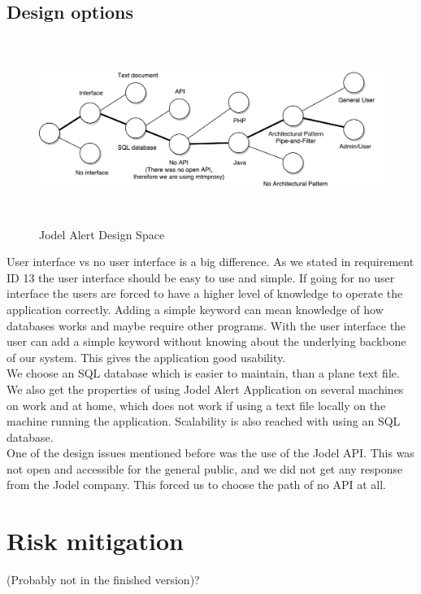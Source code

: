\documentclass[a4paper,12pt]{article}
\begin{document}
\subsection{Design options}
\begin{figure}[!h]
	\centering
	\includegraphics[height=6cm]{img/designspace.pdf}
	\caption{Jodel Alert Design Space}
	\label{Jodel}
\end{figure}
User interface vs no user interface is a big difference. As we stated in requirement ID 13 the user interface should be easy to use and simple. If going for no user interface the users are forced to have a higher level of knowledge to operate the application correctly. Adding a simple keyword can mean knowledge of how databases works and maybe require other programs. With the user interface the user can add a simple keyword without knowing about the underlying backbone of our system.
This gives the application good usability.\\

We choose an SQL database which is easier to maintain, than a plane text file. We also get the properties of using Jodel Alert Application on several machines on work and at home, which does not work if using a text file locally on the machine running the application.
Scalability is also reached with using an SQL database.\\

One of the design issues mentioned before was the use of the Jodel API. This was not open and accessible for the general public, and we did not get any response from the Jodel company. This forced us to choose the path of no API at all.
\clearpage
\section{Risk mitigation}
(Probably not in the finished version)?
\end{document}
